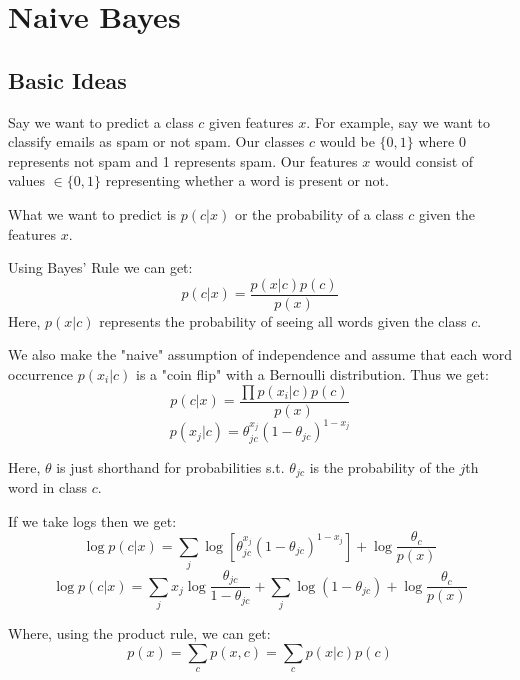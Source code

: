 
\section{Naive Bayes}
\subsection{Basic Ideas}
Say we want to predict a class $c$ given features $x$. For example, say we want to classify emails as spam or not spam. Our classes $c$ would be $\{0,1\}$ where 0 represents not spam and 1 represents spam. Our features $x$ would consist of values $\in \{0,1\}$ representing whether a word is present or not.

What we want to predict is $p(c|x)$ or the probability of a class $c$ given the features $x$.

Using Bayes' Rule we can get:
\begin{equation}
	p(c|x) = \frac{p(x|c)p(c)}{p(x)}
\end{equation}
Here, $p(x|c)$ represents the probability of seeing all words given the class $c$.

We also make the "naive" assumption of independence and assume that each word occurrence $p(x_i|c)$ is a "coin flip" with a Bernoulli distribution. Thus we get:
\begin{equation}
	p(c|x) = \frac{\prod p(x_i|c) p(c)}{p(x)}
\end{equation}
\begin{equation}
    p(x_j|c) = \theta_{jc}^{x_j} (1 - \theta_{jc})^{1-x_j}
\end{equation}

Here, $\theta$ is just shorthand for probabilities s.t. $\theta_{jc}$ is the probability of the $j$th word in class $c$.

If we take logs then we get:
\begin{equation}
\log p(c|x) = \sum_{j} \log [\theta_{jc}^{x_j} (1-\theta_{jc})^{1-x_j}] + \log \frac{\theta_c}{p(x)}
\end{equation}
\begin{equation}\label{eq:5}
\log p(c|x) = \sum_{j} x_j \log \frac{\theta_{jc}}{1 - \theta_{jc}} + \sum_j \log (1 - \theta_{jc}) + \log \frac{\theta_c}{p(x)}
\end{equation}

Where, using the product rule, we can get:
\begin{equation}
p(x) = \sum_c p(x,c) = \sum_c p(x|c) p(c)
\end{equation}

